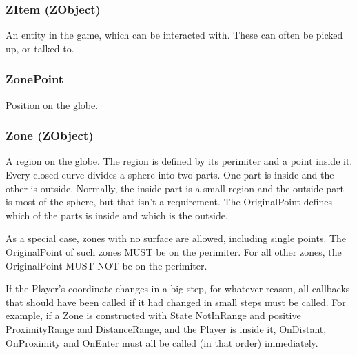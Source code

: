 \documentclass{article}
\begin{document}
\subsubsection{ZItem (ZObject)}
An entity in the game, which can be interacted with. These can often be picked up, or talked to.

\subsubsection{ZonePoint}
Position on the globe.

\subsubsection{Zone (ZObject)}
A region on the globe. The region is defined by its perimiter and a point
inside it. Every closed curve divides a sphere into two parts. One part is
inside and the other is outside. Normally, the inside part is a small region
and the outside part is most of the sphere, but that isn't a requirement. The
OriginalPoint defines which of the parts is inside and which is the outside.

As a special case, zones with no surface are allowed, including single points.
The OriginalPoint of such zones MUST be on the perimiter.  For all other zones,
the OriginalPoint MUST NOT be on the perimiter.

If the Player's coordinate changes in a big step, for whatever reason, all
callbacks that should have been called if it had changed in small steps must be
called. For example, if a Zone is constructed with State NotInRange and
positive ProximityRange and DistanceRange, and the Player is inside it,
OnDistant, OnProximity and OnEnter must all be called (in that order)
immediately.
\end{document}
